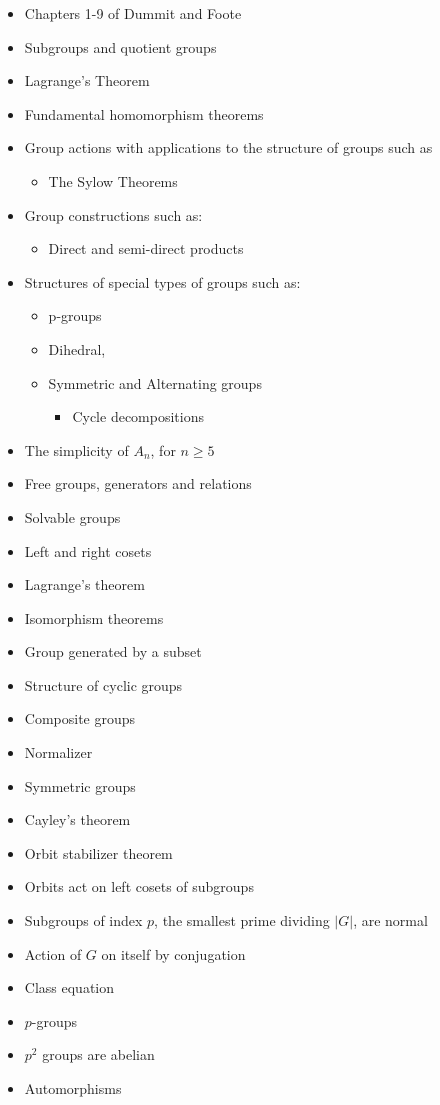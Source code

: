 \begin{itemize}
\item
  Chapters 1-9 of Dummit and Foote
\item
  Subgroups and quotient groups
\item
  Lagrange's Theorem
\item
  Fundamental homomorphism theorems
\item
  Group actions with applications to the structure of groups such as

  \begin{itemize}
  \tightlist
  \item
    The Sylow Theorems
  \end{itemize}
\item
  Group constructions such as:

  \begin{itemize}
  \tightlist
  \item
    Direct and semi-direct products
  \end{itemize}
\item
  Structures of special types of groups such as:

  \begin{itemize}
  \tightlist
  \item
    p-groups
  \item
    Dihedral,
  \item
    Symmetric and Alternating groups

    \begin{itemize}
    \tightlist
    \item
      Cycle decompositions
    \end{itemize}
  \end{itemize}
\item
  The simplicity of \(A_n\), for \(n \geq 5\)
\item
  Free groups, generators and relations
\item
  Solvable groups
\item
  Left and right cosets
\item
  Lagrange's theorem
\item
  Isomorphism theorems
\item
  Group generated by a subset
\item
  Structure of cyclic groups
\item
  Composite groups
\item
  Normalizer
\item
  Symmetric groups
\item
  Cayley's theorem
\item
  Orbit stabilizer theorem
\item
  Orbits act on left cosets of subgroups
\item
  Subgroups of index \(p\), the smallest prime dividing \(|G|\), are
  normal
\item
  Action of \(G\) on itself by conjugation
\item
  Class equation
\item
  \(p\)-groups
\item
  \(p^2\) groups are abelian
\item
  Automorphisms


\end{itemize}

